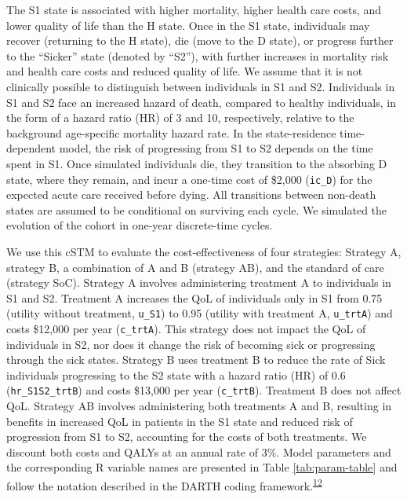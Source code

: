 \documentclass[
]{article}
\begin{document}
The S1 state is associated with higher mortality, higher health care costs, and lower quality of life than the H state. Once in the S1 state, individuals may recover (returning to the H state), die (move to the D state), or progress further to the ``Sicker'' state (denoted by ``S2''), with further increases in mortality risk and health care costs and reduced quality of life. We assume that it is not clinically possible to distinguish between individuals in S1 and S2. Individuals in S1 and S2 face an increased hazard of death, compared to healthy individuals, in the form of a hazard ratio (HR) of 3 and 10, respectively, relative to the background age-specific mortality hazard rate. In the state-residence time-dependent model, the risk of progressing from S1 to S2 depends on the time spent in S1. Once simulated individuals die, they transition to the absorbing D state, where they remain, and incur a one-time cost of \$2,000 (\texttt{ic\_D}) for the expected acute care received before dying. All transitions between non-death states are assumed to be conditional on surviving each cycle. We simulated the evolution of the cohort in one-year discrete-time cycles.

We use this cSTM to evaluate the cost-effectiveness of four strategies: Strategy A, strategy B, a combination of A and B (strategy AB), and the standard of care (strategy SoC). Strategy A involves administering treatment A to individuals in S1 and S2. Treatment A increases the QoL of individuals only in S1 from 0.75 (utility without treatment, \texttt{u\_S1}) to 0.95 (utility with treatment A, \texttt{u\_trtA}) and costs \$12,000 per year (\texttt{c\_trtA}). This strategy does not impact the QoL of individuals in S2, nor does it change the risk of becoming sick or progressing through the sick states. Strategy B uses treatment B to reduce the rate of Sick individuals progressing to the S2 state with a hazard ratio (HR) of 0.6 (\texttt{hr\_S1S2\_trtB}) and costs \$13,000 per year (\texttt{c\_trtB}). Treatment B does not affect QoL. Strategy AB involves administering both treatments A and B, resulting in benefits in increased QoL in patients in the S1 state and reduced risk of progression from S1 to S2, accounting for the costs of both treatments. We discount both costs and QALYs at an annual rate of 3\%. Model parameters and the corresponding R variable names are presented in Table \ref{tab:param-table} and follow the notation described in the DARTH coding framework.\textsuperscript{\protect\hyperlink{ref-Alarid-Escudero2019e}{12}}
\end{document}
